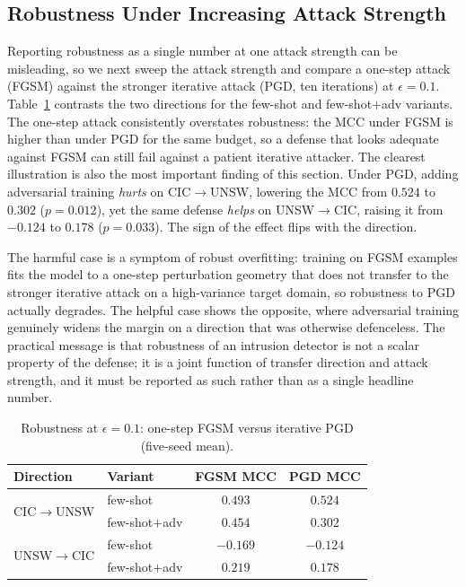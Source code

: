 \documentclass[11pt,a4paper]{article}
\begin{document}
\subsection{Robustness Under Increasing Attack Strength}
\label{sec:strength}
Reporting robustness as a single number at one attack strength can be misleading, so
we next sweep the attack strength and compare a one-step attack (FGSM) against the
stronger iterative attack (PGD, ten iterations) at $\epsilon{=}0.1$.
Table~\ref{tab:strength} contrasts the two directions for the few-shot and
few-shot$+$adv variants. The one-step attack consistently overstates robustness: the
MCC under FGSM is higher than under PGD for the same budget, so a defense that looks
adequate against FGSM can still fail against a patient iterative attacker. The
clearest illustration is also the most important finding of this section. Under PGD,
adding adversarial training \emph{hurts} on CIC$\rightarrow$UNSW, lowering the MCC
from $0.524$ to $0.302$ ($p{=}0.012$), yet the same defense \emph{helps} on
UNSW$\rightarrow$CIC, raising it from $-0.124$ to $0.178$ ($p{=}0.033$). The sign of
the effect flips with the direction.

The harmful case is a symptom of robust overfitting: training on FGSM examples fits
the model to a one-step perturbation geometry that does not transfer to the stronger
iterative attack on a high-variance target domain, so robustness to PGD actually
degrades. The helpful case shows the opposite, where adversarial training genuinely
widens the margin on a direction that was otherwise defenceless. The practical
message is that robustness of an intrusion detector is not a scalar property of the
defense; it is a joint function of transfer direction and attack strength, and it
must be reported as such rather than as a single headline number.

\begin{table}[htbp]
\centering
\caption{Robustness at $\epsilon{=}0.1$: one-step FGSM versus iterative PGD (five-seed mean).}
\label{tab:strength}
\footnotesize
\begin{tabular}{llcc}
\toprule
Direction & Variant & FGSM MCC & PGD MCC \\
\midrule
\multirow{2}{*}{CIC$\rightarrow$UNSW}
 & few-shot        & $0.493$ & $0.524$ \\
 & few-shot$+$adv  & $0.454$ & $\mathbf{0.302}$ \\
\midrule
\multirow{2}{*}{UNSW$\rightarrow$CIC}
 & few-shot        & $-0.169$ & $-0.124$ \\
 & few-shot$+$adv  & $\mathbf{0.219}$ & $\mathbf{0.178}$ \\
\bottomrule
\end{tabular}
\end{table}
\end{document}
